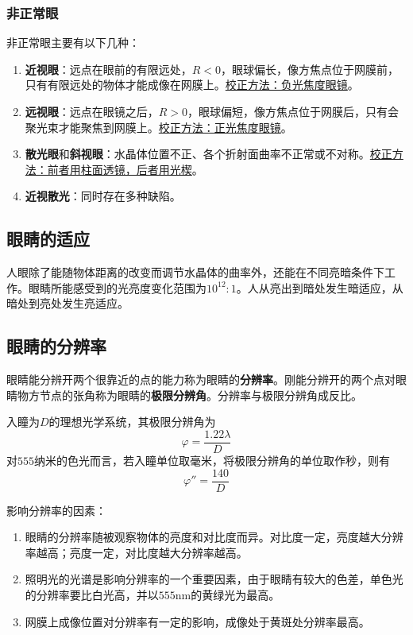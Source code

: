\subsubsection{非正常眼}
非正常眼主要有以下几种：
\begin{enumerate}
	\item \textbf{近视眼}：远点在眼前的有限远处，$R<0$，眼球偏长，像方焦点位于网膜前，只有有限远处的物体才能成像在网膜上。\uline{校正方法：负光焦度眼镜}。
	\item \textbf{远视眼}：远点在眼镜之后，$R>0$，眼球偏短，像方焦点位于网膜后，只有会聚光束才能聚焦到网膜上。\uline{校正方法：正光焦度眼镜}。
	\item \textbf{散光眼}和\textbf{斜视眼}：水晶体位置不正、各个折射面曲率不正常或不对称。\uline{校正方法：前者用柱面透镜，后者用光楔}。
	\item \textbf{近视散光}：同时存在多种缺陷。
\end{enumerate}

\subsection{眼睛的适应}
人眼除了能随物体距离的改变而调节水晶体的曲率外，还能在不同亮暗条件下工作。眼睛所能感受到的光亮度变化范围为$10^{12}:1$。人从亮出到暗处发生暗适应，从暗处到亮处发生亮适应。

\subsection{眼睛的分辨率}
眼睛能分辨开两个很靠近的点的能力称为眼睛的\textbf{分辨率}。刚能分辨开的两个点对眼睛物方节点的张角称为眼睛的\textbf{极限分辨角}。分辨率与极限分辨角成反比。

入瞳为$D$的理想光学系统，其极限分辨角为
\begin{equation}
\varphi=\frac{1.22\lambda}{D}
\label{eq:limiting-angle-of-resolution}
\end{equation}
对$555$纳米的色光而言，若入瞳单位取毫米，将极限分辨角的单位取作秒，则有
\begin{equation}
\varphi''=\frac{140}{D}
\end{equation}

\begin{note}
	影响分辨率的因素：
	\begin{enumerate}
		\item 眼睛的分辨率随被观察物体的亮度和对比度而异。对比度一定，亮度越大分辨率越高；亮度一定，对比度越大分辨率越高。
		\item 照明光的光谱是影响分辨率的一个重要因素，由于眼睛有较大的色差，单色光的分辨率要比白光高，并以$555$nm的黄绿光为最高。
		\item 网膜上成像位置对分辨率有一定的影响，成像处于黄斑处分辨率最高。
	\end{enumerate}
\end{note}

